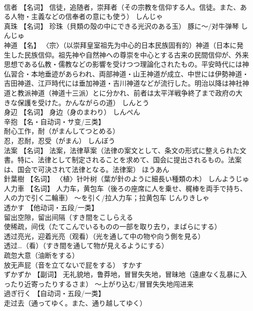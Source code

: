 \documentclass[8pt]{extreport}
\begin{document}
\begin{CJK}{UTF8}{min}
\\	信者	【名词】 信徒，追随者，崇拜者（その宗教を信仰する人。信徒。また、ある人物・主義などの信奉者の意にも使う）	しんじゃ	
\\	真珠	【名词】 珍珠（貝類の殻の中にできる光沢のある玉） 豚に～/对牛弹琴	しんじゅ	
\\	神道	【名】 〈宗〉（以崇拜皇室祖先为中心的日本民族固有的）神道（日本に発生した民族信仰。祖先神や自然神への尊崇を中心とする古来の民間信仰が、外来思想である仏教・儒教などの影響を受けつつ理論化されたもの。平安時代には神仏習合・本地垂迹があらわれ、両部神道・山王神道が成立、中世には伊勢神道・吉田神道、江戸時代には垂加神道・吉川神道などが流行した。明治以降は神社神道と教派神道（神道十三派）とに分かれ、前者は太平洋戦争終了まで政府の大きな保護を受けた。かんながらの道）	しんとう	
\\	身辺	【名词】 身边（身のまわり）	しんぺん	
\\	辛抱	【名・自动词・サ变/三类】 
\\	耐心工作，耐（がまんしてつとめる） 
\\	忍，忍耐，忍受（がまん）	しんぼう	
\\	法案	【名词】 法案，法律草案（法律の案文として、条文の形式に整えられた文書。特に、法律として制定されることを求めて、国会に提出されるもの。法案は、国会で可決されて法律となる。法律案）	ほうあん	
\\	針葉樹	【名词】 〈植〉针叶树（葉が針のように細長い種類の木）	しんようじゅ	
\\	人力車	【名词】 人力车，黄包车（後ろの座席に人を乗せ、梶棒を両手で持ち、人の力で引く二輪車） ～を引く/拉人力车；拉黄包车	じんりきしゃ	
\\	透かす	【他动词・五段/一类】 
\\	留出空隙，留出间隔（すき間をこしらえる 
\\	使稀疏，间伐（たてこんでいるものの一部を取り去り，まばらにする） 
\\	透过亮光，迎着光亮（观看）（光を通して中の物や向う側を見る） 
\\	透过…（看）（すき間を通して物が見えるようにする） 
\\	疏忽大意（油断をする） 
\\	放无声屁（音を立てないで屁をする）	すかす	
\\	ずかずか	【副词】 无礼貌地，鲁莽地，冒冒失失地，冒昧地（遠慮なく乱暴に入ったり近寄ったりするさま） ～上がり込む/冒冒失失地闯进来		
\\	過ぎ行く	【自动词・五段/一类】 
\\	走过去（通ってゆく。また、通り越してゆく） 

\end{CJK}
\end{document}
